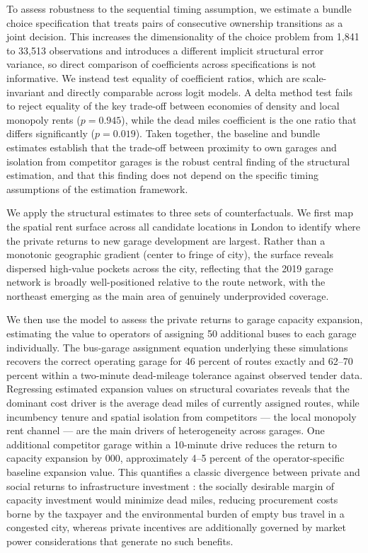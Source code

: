 \documentclass[12pt]{article}
\begin{document}
To assess robustness to the sequential timing assumption, we estimate a 
bundle choice specification that treats pairs of consecutive ownership 
transitions as a joint decision. This increases the dimensionality of the 
choice problem from 1,841 to 33,513 observations and introduces a different 
implicit structural error variance, so direct comparison of coefficients across 
specifications is not informative. We instead test equality of coefficient 
ratios, which are scale-invariant and directly comparable across logit 
models. A delta method test fails to reject equality of the key trade-off 
between economies of density and local monopoly rents ($p = 0.945$), while 
the dead miles coefficient is the one ratio that differs significantly 
($p = 0.019$). Taken together, the baseline and bundle estimates establish that the trade-off between proximity 
to own garages and isolation from competitor garages is the robust central 
finding of the structural estimation, and that this finding does not depend 
on the specific timing assumptions of the estimation framework.

We apply the structural estimates to three sets of counterfactuals. We first
map the spatial rent surface across all candidate locations in London to 
identify where the private returns to new garage development are largest. 
Rather than a monotonic geographic gradient (center to fringe of city), the surface reveals dispersed 
high-value pockets across the city, reflecting that the 2019 garage network 
is broadly well-positioned relative to the route network, with the northeast 
emerging as the main area of genuinely underprovided coverage. 

We then use the model to assess the private returns to garage capacity 
expansion, estimating the value to operators of assigning 50 additional 
buses to each garage individually. The bus-garage assignment equation 
underlying these simulations recovers the correct operating garage for 
46 percent of routes exactly and 62--70 percent within a two-minute 
dead-mileage tolerance against observed tender data. Regressing estimated 
expansion values on structural covariates reveals that the dominant cost 
driver is the average dead miles of currently assigned routes, while 
incumbency tenure and spatial isolation from competitors --- the local 
monopoly rent channel --- are the main drivers of heterogeneity across 
garages. One additional competitor garage within a 10-minute drive reduces 
the return to capacity expansion by 000, approximately 
4--5 percent of the operator-specific baseline expansion value. This 
quantifies a classic divergence between private and social returns to 
infrastructure investment \citep{laffont1993theory}: the socially desirable 
margin of capacity investment would minimize dead miles, reducing 
procurement costs borne by the taxpayer and the environmental burden of 
empty bus travel in a congested city, whereas private incentives are 
additionally governed by market power considerations that generate no such 
benefits. %
\end{document}
